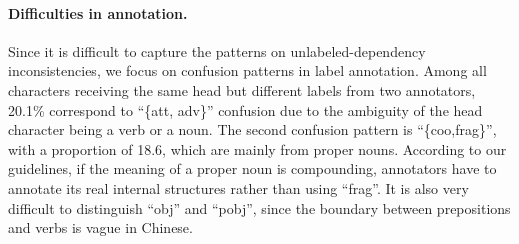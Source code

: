 


\paragraph{Difficulties in annotation.} %
Since it is difficult to capture the patterns on unlabeled-dependency inconsistencies, we focus on confusion patterns in label annotation. Among all characters receiving the same head but different labels from two annotators, 20.1\% correspond to ``\{att, adv\}'' confusion due to the ambiguity of the head character being a verb or a noun. 
The second confusion pattern is ``\{coo,frag\}'', with a proportion of 18.6, which are mainly from proper nouns. According to our guidelines, if the meaning of a proper noun is compounding, annotators have to annotate its real internal structures rather than using ``frag''. 
It is also very difficult to distinguish ``obj'' and ``pobj'', since the boundary between prepositions and verbs is vague in Chinese.














